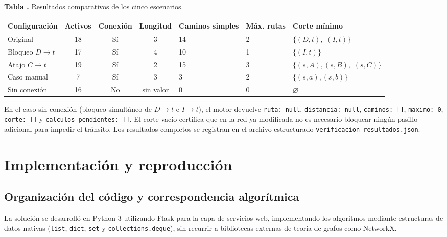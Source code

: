 \documentclass[11pt,a4paper]{article}
\begin{document}
\begin{center}
{\small
{}\label{tab:resultados}
\textbf{Tabla \thetable.} Resultados comparativos de los cinco escenarios.\par
\vspace{2mm}
\begin{tabularx}{\linewidth}{@{}p{.15\linewidth}cccp{.09\linewidth}p{.08\linewidth}X@{}}
\toprule
\textbf{Configuración} & \textbf{Activos} & \textbf{Conexión} & \textbf{Longitud} & \textbf{Caminos simples} & \textbf{Máx. rutas} & \textbf{Corte mínimo} \\
\midrule
Original               & 18 & Sí & 3        & 14 & 2 & $\{(D,t),$ $(I,t)\}$ \\
Bloqueo $D \to t$      & 17 & Sí & 4        & 10 & 1 & $\{(I,t)\}$ \\
Atajo $C \to t$        & 19 & Sí & 2        & 15 & 3 & $\{(s,A), (s,B),$ $(s,C)\}$ \\
Caso manual            & 7  & Sí & 3        & 3  & 2 & $\{(s,a), (s,b)\}$ \\
Sin conexión           & 16 & No & sin valor & 0  & 0 & $\varnothing$ \\
\bottomrule
\end{tabularx}}
\end{center}

En el caso sin conexión (bloqueo simultáneo de $D \to t$ e $I \to t$), el motor devuelve \texttt{ruta: null}, \texttt{distancia: null}, \texttt{caminos: []}, \texttt{maximo: 0}, \texttt{corte: []} y \texttt{calculos\_pendientes: []}. El corte vacío certifica que en la red ya modificada no es necesario bloquear ningún pasillo adicional para impedir el tránsito. Los resultados completos se registran en el archivo estructurado \texttt{verificacion-resultados.json}.

\newpage
\section{Implementación y reproducción}

\subsection{Organización del código y correspondencia algorítmica}
La solución se desarrolló en Python 3 utilizando Flask para la capa de servicios web, implementando los algoritmos mediante estructuras de datos nativas (\texttt{list}, \texttt{dict}, \texttt{set} y \texttt{collections.deque}), sin recurrir a bibliotecas externas de teoría de grafos como NetworkX.
\end{document}
